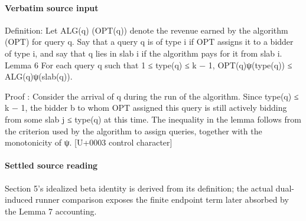 \documentclass[10pt]{article}
\begin{document}
\paragraph{Verbatim source input}
\begin{ReviewVerbatim}
Definition: Let ALG(q) (OPT(q)) denote the revenue earned by the algorithm (OPT) for
query q. Say that a query q is of type i if OPT assigns it to a bidder of type i, and say that q
lies in slab i if the algorithm pays for it from slab i.
Lemma 6 For each query q such that 1 ≤ type(q) ≤ k − 1,
OPT(q)ψ(type(q)) ≤ ALG(q)ψ(slab(q)).

Proof : Consider the arrival of q during the run of the algorithm. Since type(q) ≤ k − 1, the
bidder b to whom OPT assigned this query is still actively bidding from some slab j ≤ type(q)
at this time. The inequality in the lemma follows from the criterion used by the algorithm to
assign queries, together with the monotonicity of ψ.
[U+0003 control character]
\end{ReviewVerbatim}

\paragraph{Settled source reading}
\begin{sloppypar}
Section 5's idealized beta identity is derived from its definition;\allowbreak{} the actual dual-\allowbreak{}induced runner comparison exposes the finite endpoint term later absorbed by the Lemma 7 accounting.\allowbreak{}
\end{sloppypar}
\end{document}
